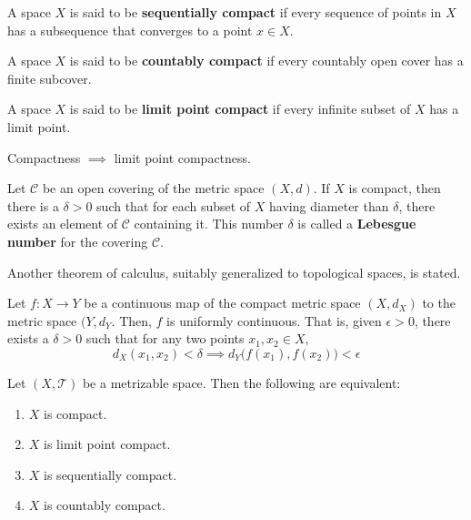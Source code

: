     \begin{definition}
    A space $X$ is said to be \textbf{sequentially compact} if every sequence of points in $X$ has a subsequence that converges to a point $x \in X$. 
    \end{definition}

    \begin{definition}
    A space $X$ is said to be \textbf{countably compact} if every countably open cover has a finite subcover. 
    \end{definition}

    \begin{definition}
    A space $X$ is said to be \textbf{limit point compact} if every infinite subset of $X$ has a limit point. 
    \end{definition}

    \begin{theorem}
    Compactness $\implies$ limit point compactness.  
    \end{theorem}

    \begin{lemma}
    Let $\mathscr{C}$ be an open covering of the metric space $(X, d)$. If $X$ is compact, then there is a $\delta > 0$ such that for each subset of $X$ having diameter than $\delta$, there exists an element of $\mathscr{C}$ containing it. This number $\delta$ is called a \textbf{Lebesgue number} for the covering $\mathscr{C}$. 
    \end{lemma}

    Another theorem of calculus, suitably generalized to topological spaces, is stated. 
    \begin{theorem}
    Let $f: X \longrightarrow Y$ be a continuous map of the compact metric space $(X,d_X)$ to the metric space $(Y, d_Y$. Then, $f$ is uniformly continuous. That is, given $\epsilon > 0$, there exists a $\delta > 0$ such that for any two points $x_1, x_2 \in X$, 
    \[d_X (x_1, x_2) < \delta \implies d_Y \big( f(x_1), f(x_2)\big) < \epsilon\]
    \end{theorem}

    \begin{theorem}
    Let $(X, \mathscr{T})$ be a metrizable space. Then the following are equivalent: 
    \begin{enumerate}
        \item $X$ is compact. 
        \item $X$ is limit point compact. 
        \item $X$ is sequentially compact. 
        \item $X$ is countably compact. 
    \end{enumerate}
    \end{theorem}

